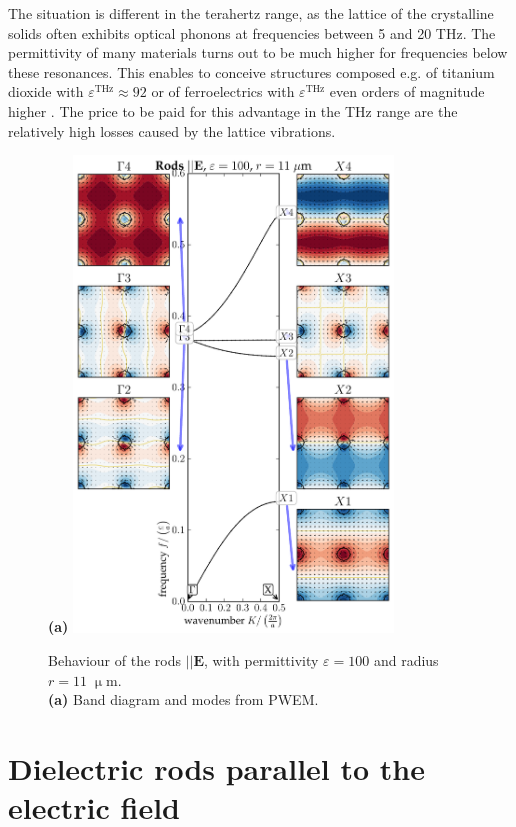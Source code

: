 {The situation is different in the terahertz range, as the lattice of the crystalline solids often exhibits optical phonons at frequencies between 5 and 20 THz. The permittivity of many materials turns out to be much higher for frequencies below these resonances. This enables to conceive structures composed e.g. of titanium dioxide \cite{baumard1977_epsilon_TiO2} with $\varepsilon^{\text{THz}} \approx 92$ or of ferroelectrics with $\varepsilon^{\text{THz}}$ even orders of magnitude higher \cite{skoromets2011tuning}. The price to be paid for this advantage in the THz range are the relatively high losses caused by the lattice vibrations.

\begin{figure}[ht] \caption{Behaviour of the rods $||\mathbf E$, with permittivity $\varepsilon = 100$ and radius $r=11\;\upmu$m.\\
\textbf{(a)} Band diagram and modes from PWEM. 
} \label{fg_erod_radius11} \centering 
\textbf{(a)}	\includegraphics[width=8.5cm]{img/ERods_eps100_R11_PWEM.pdf}
\end{figure}

}






\section{Dielectric rods parallel to the electric field} %

